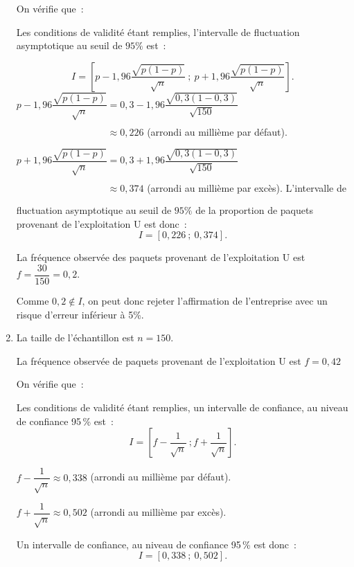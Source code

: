 \begin{corrige}
\begin{enumerate}
          \par
          On vérifie que~:
          Les conditions de validité étant remplies, l'intervalle de fluctuation asymptotique au seuil de $95\%$ est~:
          \par
          \[ I=\left[p-1,96\dfrac{\sqrt{p(1-p)}}{\sqrt{n}}~;~p+1,96\dfrac{\sqrt{p(1-p)}}{\sqrt{n}}\right]. \]
          \medskip
          $p-1,96\dfrac{\sqrt{p(1-p)}}{\sqrt{n}}=0,3-1,96\dfrac{\sqrt{0,3(1-0,3)}}{\sqrt{150}}$\\
          $\phantom{p-1,96\dfrac{\sqrt{p(1-p)}}{\sqrt{n}}}  \approx 0,226$ (arrondi au millième par défaut).
          \medskip
          $p+1,96\dfrac{\sqrt{p(1-p)}}{\sqrt{n}}=0,3+1,96\dfrac{\sqrt{0,3(1-0,3)}}{\sqrt{150}}$\\
          $\phantom{p+1,96\dfrac{\sqrt{p(1-p)}}{\sqrt{n}}} \approx 0,374 $ (arrondi au millième par excès).
          \medskip
          L'intervalle de fluctuation asymptotique au seuil de $95\%$ de la proportion de paquets  provenant de l’exploitation U est donc~:
          \[ I=[0,226~;~0,374]. \]
          \par
          La fréquence observée des paquets  provenant de l’exploitation U  est $f=\dfrac{30}{150}=0,2$.
          \par
          Comme $0,2 \notin I$, on peut donc rejeter l'affirmation de l'entreprise avec un risque d'erreur inférieur à 5\%.
          \item
          La taille  de l'échantillon est $n=150$.
          \par
          La fréquence observée de paquets provenant de l'exploitation U est $f=0,42$
          \par
          On vérifie que~:
          Les conditions de validité étant remplies, un intervalle de confiance, au niveau de confiance 95\,\% est~:
          \[ I=\left[ f-\dfrac{1}{\sqrt{n}}~; f+\dfrac{1}{\sqrt{n}}  \right]. \]
          \par
          $f-\dfrac{1}{\sqrt{n}} \approx 0,338$ (arrondi au millième par défaut).
          \par
          $f+\dfrac{1}{\sqrt{n}} \approx 0,502$ (arrondi au millième par excès).
          \par
          Un intervalle de confiance, au niveau de confiance 95\,\% est donc~:
          \[ I=[0,338~;~0,502] .\]
     \end{enumerate}
\end{corrige}
